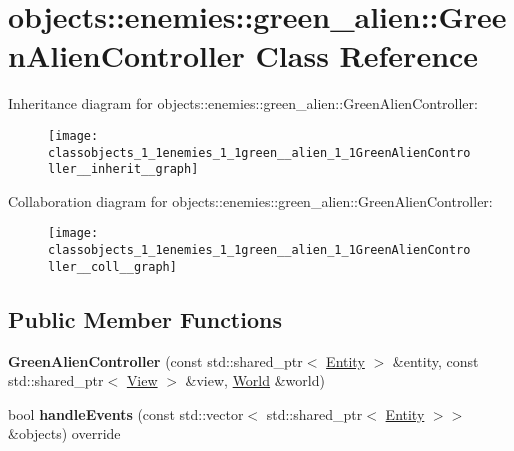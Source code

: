 \hypertarget{classobjects_1_1enemies_1_1green__alien_1_1GreenAlienController}{}\section{objects\+:\+:enemies\+:\+:green\+\_\+alien\+:\+:Green\+Alien\+Controller Class Reference}
\label{classobjects_1_1enemies_1_1green__alien_1_1GreenAlienController}


Inheritance diagram for objects\+:\+:enemies\+:\+:green\+\_\+alien\+:\+:Green\+Alien\+Controller\+:\nopagebreak
\begin{figure}[H]
\begin{center}
\leavevmode
\texttt{[image: classobjects\_1\_1enemies\_1\_1green\_\_alien\_1\_1GreenAlienController\_\_inherit\_\_graph]}
\end{center}
\end{figure}


Collaboration diagram for objects\+:\+:enemies\+:\+:green\+\_\+alien\+:\+:Green\+Alien\+Controller\+:\nopagebreak
\begin{figure}[H]
\begin{center}
\leavevmode
\texttt{[image: classobjects\_1\_1enemies\_1\_1green\_\_alien\_1\_1GreenAlienController\_\_coll\_\_graph]}
\end{center}
\end{figure}
\subsection*{Public Member Functions}
\begin{DoxyCompactItemize}
\item 
\mbox{\label{classobjects_1_1enemies_1_1green__alien_1_1GreenAlienController_af175899c90308195285ff3e7db10c9df}}
{\bfseries Green\+Alien\+Controller} (const std\+::shared\+\_\+ptr$<$ \hyperlink{classobjects_1_1Entity}{Entity} $>$ \&entity, const std\+::shared\+\_\+ptr$<$ \hyperlink{classobjects_1_1View}{View} $>$ \&view, \hyperlink{classWorld}{World} \&world)
\item 
\mbox{\label{classobjects_1_1enemies_1_1green__alien_1_1GreenAlienController_a63fb5ef2420687dd3dc37412a13f9c8e}}
bool {\bfseries handle\+Events} (const std\+::vector$<$ std\+::shared\+\_\+ptr$<$ \hyperlink{classobjects_1_1Entity}{Entity} $>$$>$ \&objects) override
\end{DoxyCompactItemize}
